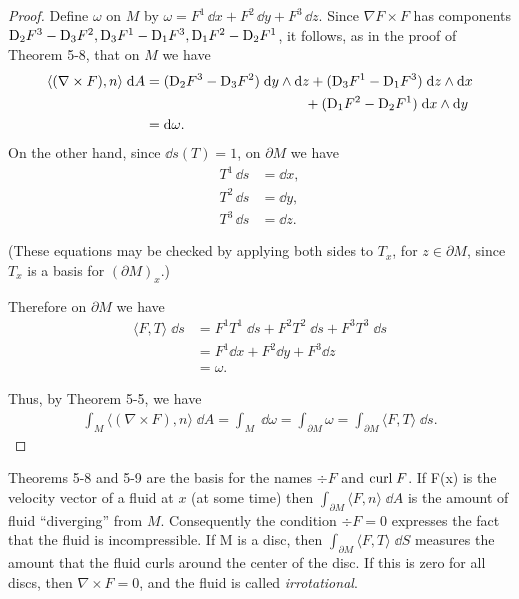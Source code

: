 \begin{proof}
    Define $\omega$ on $M$ by $\omega=F^1\,\dd x + F^2\,\dd y + F^3\,\dd z$. Since $\nabla F\times F$ has 
    components $\mathrm{D}_2F^3 - \mathrm{D}_3F^2, \mathrm{D}_3F^1-\mathrm{D}_1F^3, \mathrm{D}_1F^2-\mathrm{D}_2F^1$, it follows,
    as in the proof of Theorem 5-8, that on $M$ we have 
    \begin{align*}
        \langle (\nabla\times F), n\rangle\;\dd A 
        & = (\R{D}_2F^3-\R{D}_3F^2)\;\dd y\wedge\dd z + (\R{D}_3F^1-\R{D}_1F^3)\;\dd z\wedge\dd x\\
        & \hspace*{11.4em} + (\R{D}_1F^2-\R{D}_2F^1)\;\dd x\wedge\dd y \\
        & = \dd\omega.
    \end{align*}
    On the other hand, since $\dd s(T)=1$, on $\partial M$ we have 
    \begin{align*}
        T^1\,\dd s & = \dd x, \\
        T^2\,\dd s & = \dd y, \\
        T^3\,\dd s & = \dd z.
    \end{align*}

    (These equations may be checked by applying both sides to $T_x$, 
    for $z\in\partial M$, since $T_x$ is a basis for $(\partial M)_x$.)

    Therefore on $\partial M$ we have
    \begin{align*}
        \langle F, T\rangle \;\dd s 
        & = F^1T^1\;\dd s + F^2T^2\;\dd s + F^3T^3\;\dd s \\
        & = F^1\dd x + F^2\dd y + F^3\dd z \\
        & = \omega.
    \end{align*}

    Thus, by Theorem 5-5, we have 
    \begin{align*}
        \int_{M}\langle (\nabla\times F), n\rangle\;\dd A 
        = \int_{M}\;\dd\omega
        = \int_{\partial M}\omega
        = \int_{\partial M}\langle F,T\rangle\;\dd s.
    \end{align*}
\end{proof}

Theorems 5-8 and 5-9 are the basis for the names $\div F$ and $\mathrm{curl}\; F$. If F(x) is the 
velocity vector of a fluid at $x$ (at some time) then $\int_{\partial M} \langle F,n\rangle\;\dd A$ 
is the amount of fluid ``diverging'' from $M$. Consequently the condition $\div F=0$ expresses
the fact that the fluid is incompressible. If M is a disc, then $\int_{\partial M} \langle F,T\rangle\;\dd S$
measures the amount that the fluid curls around the center of the disc. If this is zero for all discs, 
then $\nabla \times F=0$, and the fluid is called \textit{irrotational}.

